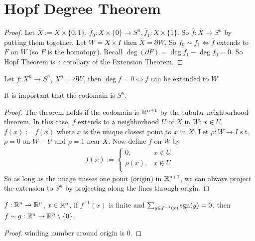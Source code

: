 \documentclass[12pt,class=article,crop=false]{standalone}
\begin{document}
\section{Hopf Degree Theorem}
\begin{proof}
Let $ \overline{X}:= X \times \{0,1\} $, $ \overline{f}_0 : X \times \{0\} \to S^{n}, \overline{f}_1: X \times \{1\} $. So $ \overline{f}: \overline{X} \to S^{n}$ by putting them together. Let $ W = X \times I$ then $ \overline{X} = \partial W$. So $ f_0 \sim f_1 \iff \overline{ f}$ extends to $ F$ on $ W$ (so $ F$ is the homotopy). Recall $ \deg (\partial F) = \deg f_1 - \deg f_0 = 0$. So Hopf Theorem is a corollary of the Extension Theorem.
\end{proof}
\begin{thm}
Let $ f: X^{n} \to S^{n}$, $ X^{n} = \partial W$, then $ \deg f = 0 \iff f$ can be extended to $ W$.
\end{thm}

\begin{remark}
It is important that the codomain is $ S^{n}$.
\end{remark}

\begin{proof}
The theorem holds if the codomain is $ \mathbb{R}^{n+1}$ by the tubular neighborhood theorem. In this case, $ f$ extends to a neighborhood  $ U$ of  $ X$ in  $ W$:  $ x \in U$, $ f(x):= f(\overline{x})$ where $ \overline{x}$ is the unique closest point to $ x$ in  $ X$. Let $ \rho: W \to I$ s.t.\ $ \rho=0$ on $ W-U$ and  $ \rho = 1$ near $ X$. Now define  $ f$ on  $ W$ by
 \begin{align*}
	f(x) := \begin{cases}
		0,& x \not\in U\\
		\rho(x), &x \in U\\
	\end{cases}
\end{align*}
So as long as the image misses one point (origin) in $ \mathbb{R}^{n+1}$, we can always project the extension to $ S^{n}$ by projecting along the lines through origin.

\end{proof}

\begin{lem}
$ f: \mathbb{R}^{n} \to \mathbb{R}^{n}$, $ x \in \mathbb{R}^{n}$, if $ f^{-1}(x)$ is finite and $ \sum_{y \in f^{-1}(x)} \operatorname{sgn}(y) = 0$, then $ f \sim g: \mathbb{R}^{n} \to \mathbb{R}^{n} \setminus \{0\} $.
\end{lem}
\begin{proof}
winding number around origin is 0. 
\end{proof}
\end{document}
